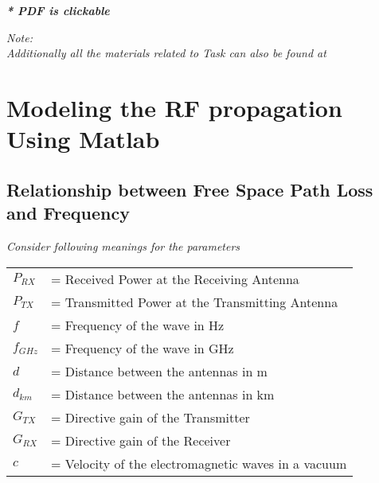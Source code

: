 \documentclass[a4paper,11pt]{article}%
\begin{document}

\tableofcontents

\begin{center}
	\textbf{\textit{* PDF is clickable}}
\end{center}



\textit{Note:}\\
\textit{Additionally all the materials related to Task can also be found at \url{}}



\pagebreak
\section{Modeling the RF propagation Using Matlab}
\subsection{Relationship between Free Space Path Loss and Frequency}

\textit{Consider  following meanings for the parameters}\\

\begin{tabular}{l l }
	$P_{RX}$ & = Received Power at the Receiving Antenna\\
	$P_{TX}$ & = Transmitted Power at the Transmitting Antenna\\
	$f$ & = Frequency of the wave in Hz\\
	$f_{GHz}$ & = Frequency of the wave in GHz\\
	$d$& = Distance between the antennas in m\\
	$d_{km}$& = Distance between the antennas in km\\
	$G_{TX}$& = Directive gain of the Transmitter\\
	$G_{RX}$& = Directive gain of the Receiver\\
	$c$& = Velocity of the electromagnetic waves in a vacuum\\

\end{tabular}\\[1cm]
\end{document}
